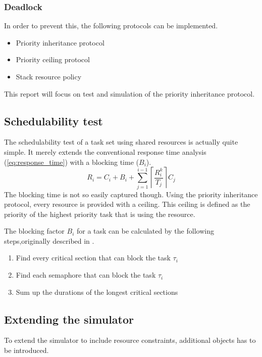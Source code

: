 \documentclass{acm_proc_article-sp}
\begin{document}
\subsubsection{Deadlock}


In order to prevent this, the following protocols can be implemented.
\begin{itemize}
\item Priority inheritance protocol
\item Priority ceiling protocol
\item Stack resource policy
\end{itemize}
This report will focus on test and simulation of the priority inheritance protocol.

\subsection{Schedulability test}
The schedulability test of a task set using shared resources is actually quite simple. It merely extends the conventional response time analysis (\ref{eq:response_time}) with a blocking time ($B_{i}$).
\begin{equation}
\label{eq:response_time_with_blocking}
R_{i}=C_{i} + B_{i} + \displaystyle\sum\limits_{j=1}^{i-1} \left\lceil \frac{R_{i}^{k}}{T_{j}}\right\rceil C_{j}
\end{equation}
The blocking time is not so easily captured though. Using the priority inheritance protocol, every resource is provided with a ceiling. This ceiling is defined as the priority of the highest priority task that is using the resource.




The blocking factor $B_{i}$ for a task can be calculated by the following steps,originally described in \cite{buttazzo1997hard}.



\begin{enumerate}
\item Find every critical section that can block the task $\tau_{i}$
\item Find each semaphore that can block the task $\tau_{i}$
\item Sum up the durations of the longest critical sections
\end{enumerate}
\subsection{Extending the simulator}
To extend the simulator to include resource constraints, additional objects has to be introduced.
\end{document}

